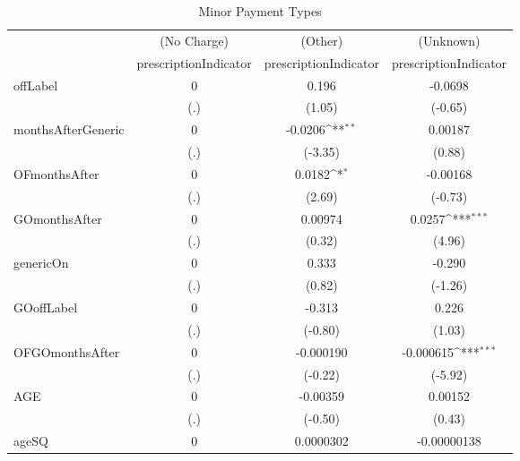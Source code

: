 \begin{table}[htbp]\centering
\def\sym#1{\ifmmode^{#1}\else\(^{#1}\)\fi}
\caption{Minor Payment Types\label{tab1}}
\begin{tabular}{l*{3}{c}}
\hline\hline
            &\multicolumn{1}{c}{(No Charge)}&\multicolumn{1}{c}{(Other)}&\multicolumn{1}{c}{(Unknown)}\\
            &\multicolumn{1}{c}{prescriptionIndicator}&\multicolumn{1}{c}{prescriptionIndicator}&\multicolumn{1}{c}{prescriptionIndicator}\\
\hline
offLabel    &           0         &       0.196         &     -0.0698         \\
            &         (.)         &      (1.05)         &     (-0.65)         \\
[1em]
monthsAfterGeneric&           0         &     -0.0206\sym{**} &     0.00187         \\
            &         (.)         &     (-3.35)         &      (0.88)         \\
[1em]
OFmonthsAfter&           0         &      0.0182\sym{*}  &    -0.00168         \\
            &         (.)         &      (2.69)         &     (-0.73)         \\
[1em]
GOmonthsAfter&           0         &     0.00974         &      0.0257\sym{***}\\
            &         (.)         &      (0.32)         &      (4.96)         \\
[1em]
genericOn   &           0         &       0.333         &      -0.290         \\
            &         (.)         &      (0.82)         &     (-1.26)         \\
[1em]
GOoffLabel  &           0         &      -0.313         &       0.226         \\
            &         (.)         &     (-0.80)         &      (1.03)         \\
[1em]
OFGOmonthsAfter&           0         &   -0.000190         &   -0.000615\sym{***}\\
            &         (.)         &     (-0.22)         &     (-5.92)         \\
[1em]
AGE         &           0         &    -0.00359         &     0.00152         \\
            &         (.)         &     (-0.50)         &      (0.43)         \\
[1em]
ageSQ       &           0         &   0.0000302         & -0.00000138         \\

\end{tabular}
\end{table}
